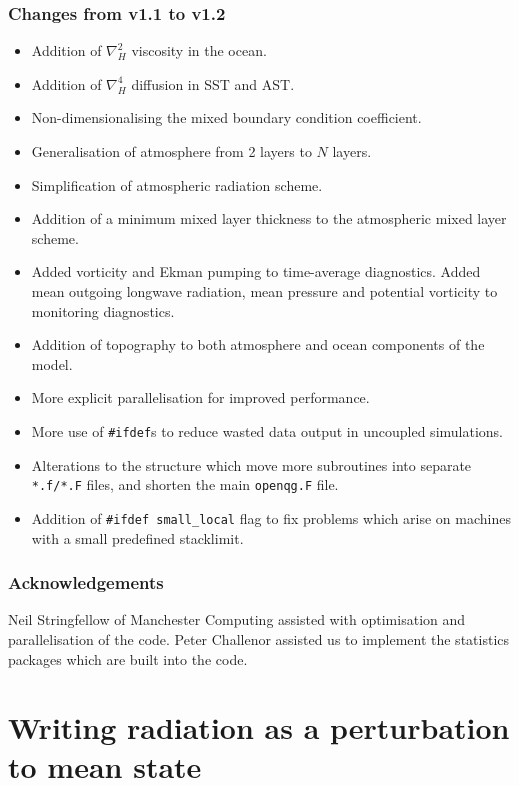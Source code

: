 \documentclass[11pt, a4paper,twoside]{article}
\numberwithin{equation}{section}
\begin{document}
\subsubsection{Changes from v1.1 to v1.2}
\begin{itemize}
\item Addition of $\nabla_H^2$ viscosity in the ocean.
\item Addition of $\nabla_H^4$ diffusion in SST and AST.
\item Non-dimensionalising the mixed boundary condition coefficient.
\item Generalisation of atmosphere from 2 layers to $N$ layers.
\item Simplification of atmospheric radiation scheme.
\item Addition of a minimum mixed layer thickness to the atmospheric mixed layer scheme.
\item Added vorticity and Ekman pumping to time-average diagnostics. Added mean outgoing longwave radiation, mean pressure and potential vorticity to monitoring diagnostics.
\item Addition of topography to both atmosphere and ocean  components of the model.
\item More explicit parallelisation for improved performance.
\item More use of \verb=#ifdef=s to reduce wasted data output in uncoupled simulations.
\item Alterations to the structure which move more subroutines into separate \verb=*.f/*.F= files, and shorten the main \verb=openqg.F= file.
\item Addition of \verb=#ifdef small_local= flag to fix problems which arise on machines with a small predefined stacklimit.
\end{itemize}

\subsubsection*{Acknowledgements}
Neil Stringfellow of Manchester Computing assisted with optimisation and parallelisation of the code.
Peter Challenor assisted us to implement the statistics packages which are built into the code.

\newpage

\appendix

\section{Writing radiation as a perturbation to mean state}\label{app:rad}
\end{document}
